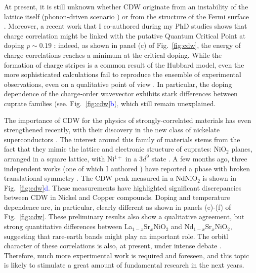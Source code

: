 \documentclass[a4paper, 12pt]{article}
\begin{document}
At present, it is still unknown whether CDW originate from an instability of the lattice itself (phonon-driven scenario \cite{wang2021charge}) or from the structure of the Fermi surface \cite{comin2014charge}. Moreover, a recent work that I co-authored during my PhD studies shows that charge correlation might be linked with the putative Quantum Critical Point at doping $p\sim0.19$ \cite{arpaia2022signature}: indeed, as shown in panel (c) of Fig.~\ref{fig:cdw}, the energy of charge correlations reaches a minimum at the critical doping.
While the formation of charge stripes is a common result of the Hubbard model, even the more sophisticated calculations fail to reproduce the ensemble of experimental observations, even on a qualitative point of view \cite{comin2014charge, jiang2019superconductivity, marino2022stripes}. In particular, the doping dependence of the charge-order wavevector exhibits stark differences between cuprate families \cite{comin2016resonant} (see. Fig.~\ref{fig:cdw}\textcolor{blue}{b}), which still remain unexplained. 

\medskip

The importance of CDW for the physics of strongly-correlated materials has even strengthened recently, with their discovery in the new class of nickelate superconductors \cite{li2019superconductivity}. The interest around this family of materials stems from the fact that they mimic the lattice and electronic structure of cuprates: NiO$_2$ planes, arranged in a square lattice, with Ni$^{1+}$ in a $3d^9$ state \cite{hepting2020electronic, been2021electronic}.
A few months ago, three independent works (one of which I authored \cite{krieger2022charge}) have reported a phase with broken translational symmetry \cite{krieger2022charge, rossi2022broken, tam2022charge}. The CDW peak measured in a NdNiO$_2$ is shown in Fig.~\ref{fig:cdw}\textcolor{blue}{d}.
These measurements have highlighted significant discrepancies between CDW in Nickel and Copper compounds. Doping and temperature dependence are, in particular, clearly different as shown in panels (e)-(f) of Fig.~\ref{fig:cdw}. These preliminary results also show a qualitative agreement, but strong quantitative differences between La$_{1-x}$Sr$_x$NiO$_2$ and Nd$_{1-x}$Sr$_x$NiO$_2$, suggesting that rare-earth bands might play an important role. The orbitl character of these correlations is also, at present, under intense debate \cite{krieger2022charge, tam2022charge}.
Therefore, much more experimental work is required and foreseen, and this topic is likely to stimulate a great amount of fundamental research in the next years.
\end{document}

